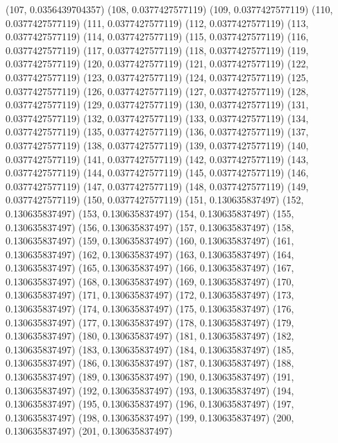 {					(107, 0.0356439704357)
					(108, 0.0377427577119)
					(109, 0.0377427577119)
					(110, 0.0377427577119)
					(111, 0.0377427577119)
					(112, 0.0377427577119)
					(113, 0.0377427577119)
					(114, 0.0377427577119)
					(115, 0.0377427577119)
					(116, 0.0377427577119)
					(117, 0.0377427577119)
					(118, 0.0377427577119)
					(119, 0.0377427577119)
					(120, 0.0377427577119)
					(121, 0.0377427577119)
					(122, 0.0377427577119)
					(123, 0.0377427577119)
					(124, 0.0377427577119)
					(125, 0.0377427577119)
					(126, 0.0377427577119)
					(127, 0.0377427577119)
					(128, 0.0377427577119)
					(129, 0.0377427577119)
					(130, 0.0377427577119)
					(131, 0.0377427577119)
					(132, 0.0377427577119)
					(133, 0.0377427577119)
					(134, 0.0377427577119)
					(135, 0.0377427577119)
					(136, 0.0377427577119)
					(137, 0.0377427577119)
					(138, 0.0377427577119)
					(139, 0.0377427577119)
					(140, 0.0377427577119)
					(141, 0.0377427577119)
					(142, 0.0377427577119)
					(143, 0.0377427577119)
					(144, 0.0377427577119)
					(145, 0.0377427577119)
					(146, 0.0377427577119)
					(147, 0.0377427577119)
					(148, 0.0377427577119)
					(149, 0.0377427577119)
					(150, 0.0377427577119)
					(151, 0.130635837497)
					(152, 0.130635837497)
					(153, 0.130635837497)
					(154, 0.130635837497)
					(155, 0.130635837497)
					(156, 0.130635837497)
					(157, 0.130635837497)
					(158, 0.130635837497)
					(159, 0.130635837497)
					(160, 0.130635837497)
					(161, 0.130635837497)
					(162, 0.130635837497)
					(163, 0.130635837497)
					(164, 0.130635837497)
					(165, 0.130635837497)
					(166, 0.130635837497)
					(167, 0.130635837497)
					(168, 0.130635837497)
					(169, 0.130635837497)
					(170, 0.130635837497)
					(171, 0.130635837497)
					(172, 0.130635837497)
					(173, 0.130635837497)
					(174, 0.130635837497)
					(175, 0.130635837497)
					(176, 0.130635837497)
					(177, 0.130635837497)
					(178, 0.130635837497)
					(179, 0.130635837497)
					(180, 0.130635837497)
					(181, 0.130635837497)
					(182, 0.130635837497)
					(183, 0.130635837497)
					(184, 0.130635837497)
					(185, 0.130635837497)
					(186, 0.130635837497)
					(187, 0.130635837497)
					(188, 0.130635837497)
					(189, 0.130635837497)
					(190, 0.130635837497)
					(191, 0.130635837497)
					(192, 0.130635837497)
					(193, 0.130635837497)
					(194, 0.130635837497)
					(195, 0.130635837497)
					(196, 0.130635837497)
					(197, 0.130635837497)
					(198, 0.130635837497)
					(199, 0.130635837497)
					(200, 0.130635837497)
					(201, 0.130635837497)
}
